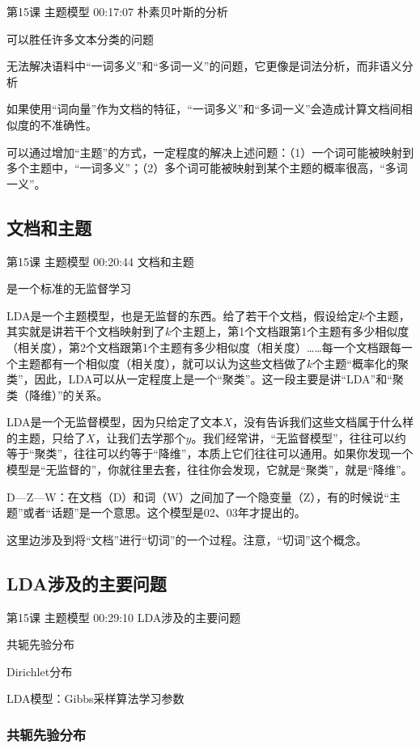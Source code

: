 \documentclass[UTF8]{ctexart}
\begin{document}
第15课 主题模型 00:17:07 朴素贝叶斯的分析

可以胜任许多文本分类的问题

无法解决语料中“一词多义”和“多词一义”的问题，它更像是词法分析，而非语义分析

如果使用“词向量”作为文档的特征，“一词多义”和“多词一义”会造成计算文档间相似度的不准确性。

可以通过增加“主题”的方式，一定程度的解决上述问题：（1）一个词可能被映射到多个主题中，“一词多义”；（2）多个词可能被映射到某个主题的概率很高，“多词一义”。

\subsection{文档和主题}

第15课 主题模型 00:20:44 文档和主题

是一个标准的无监督学习

LDA是一个主题模型，也是无监督的东西。给了若干个文档，假设给定$k$个主题，其实就是讲若干个文档映射到了$k$个主题上，第1个文档跟第1个主题有多少相似度（相关度），第2个文档跟第1个主题有多少相似度（相关度）……每一个文档跟每一个主题都有一个相似度（相关度），就可以认为这些文档做了$k$个主题“概率化的聚类”，因此，LDA可以从一定程度上是一个“聚类”。这一段主要是讲“LDA”和“聚类（降维）”的关系。

LDA是一个无监督模型，因为只给定了文本$X$，没有告诉我们这些文档属于什么样的主题，只给了$X$，让我们去学那个$y$。我们经常讲，“无监督模型”，往往可以约等于“聚类”，往往可以约等于“降维”，本质上它们往往可以通用。如果你发现一个模型是“无监督的”，你就往里去套，往往你会发现，它就是“聚类”，就是“降维”。

D---Z---W：在文档（D）和词（W）之间加了一个隐变量（Z），有的时候说“主题”或者“话题”是一个意思。这个模型是02、03年才提出的。

这里边涉及到将“文档”进行“切词”的一个过程。注意，“切词”这个概念。

\subsection{LDA涉及的主要问题}

第15课 主题模型 00:29:10 LDA涉及的主要问题

共轭先验分布

Dirichlet分布

LDA模型：Gibbs采样算法学习参数

\subsubsection{共轭先验分布}
\end{document}
